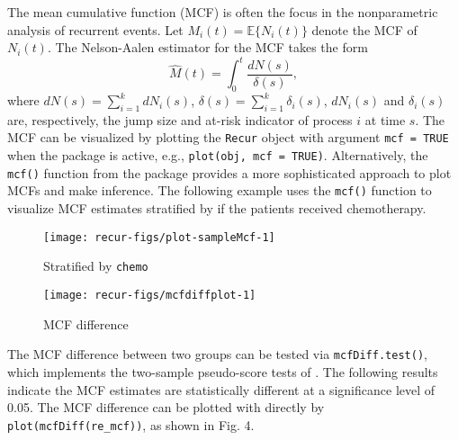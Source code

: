 The mean cumulative function (MCF) is often the focus in the
nonparametric analysis of recurrent events. Let
\(M_i(t)=\mathbb{E}\{N_i(t)\}\) denote the MCF of \(N_i(t)\). The
Nelson-Aalen estimator \citep{nelson2003siam} for the MCF takes the form
\[\widehat{M}(t) = \int_0^t \frac{dN(s)}{\delta(s)},\] where
\(dN(s)=\sum_{i=1}^k dN_i(s)\),
\(\delta(s) = \sum_{i=1}^k \delta_i(s)\), \(dN_i(s)\) and
\(\delta_i(s)\) are, respectively, the jump size and at-risk indicator
of process \(i\) at time \(s\). The MCF can be visualized by plotting
the \texttt{Recur} object with argument \texttt{mcf\ =\ TRUE} when the
 package is active, e.g., \texttt{plot(obj,\ mcf\ =\ TRUE)}.
Alternatively, the \texttt{mcf()} function from the  package
provides a more sophisticated approach to plot MCFs and make inference.
The following example uses the \texttt{mcf()} function to visualize MCF
estimates stratified by if the patients received chemotherapy.

\begin{Shaded}
\begin{Highlighting}[]
\StringTok{ } 
 \NormalTok{, } \NormalTok{:}\NormalTok{) +}
\StringTok{    }\NormalTok{(} \NormalTok{) }
\end{Highlighting}
\end{Shaded}

\vspace*{-.3cm}\begin{figure}[H]
    \centering
    \begin{minipage}{0.24\textwidth}
        \centering
        \texttt{[image: recur-figs/plot-sampleMcf-1]}
        \caption{Stratified by \texttt{chemo}}
    \end{minipage}\hfill
    \begin{minipage}{0.24\textwidth}
        \centering
        \texttt{[image: recur-figs/mcfdiffplot-1]}
        \caption{MCF difference}
    \end{minipage}
\end{figure}

The MCF difference between two groups can be tested via
\texttt{mcfDiff.test()}, which implements the two-sample pseudo-score
tests of \citep{cook1996biometrics}. The following results indicate the
MCF estimates are statistically different at a significance level of
0.05. The MCF difference can be plotted with directly by
\texttt{plot(mcfDiff(re\_mcf))}, as shown in Fig. 4.

